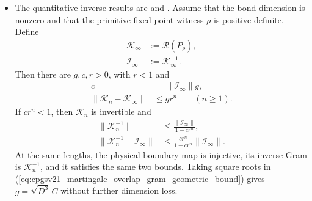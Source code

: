 \documentclass{article}
\begin{document}
\begin{itemize}
    \item The quantitative inverse results are
          and
          .
          Assume that the bond dimension is nonzero and that the primitive
          fixed-point witness $\rho$ is positive definite. Define
          \begin{align}
              \mathcal K_\infty
               & :=\mathscr R(P_\rho),
              \label{eq:cpgsv21_martingale_overlap_limiting_gram} \\
              \mathcal I_\infty
               & :=\mathcal K_\infty^{-1}.
              \label{eq:cpgsv21_martingale_overlap_limiting_inverse_gram}
          \end{align}
          Then there are $g,c,r>0$, with $r<1$ and
          \begin{align}
              c
               & =\lVert\mathcal I_\infty\rVert g,
              \label{eq:cpgsv21_martingale_overlap_inverse_perturbation_constant} \\
              \lVert\mathcal K_n-\mathcal K_\infty\rVert
               & \leq gr^n
              \qquad(n\geq1).
              \label{eq:cpgsv21_martingale_overlap_gram_norm_geometric_bound}
          \end{align}
          If $cr^n<1$, then $\mathcal K_n$ is invertible and
          \begin{align}
              \lVert\mathcal K_n^{-1}\rVert
               & \leq
              \frac{\lVert\mathcal I_\infty\rVert}{1-cr^n},
              \label{eq:cpgsv21_martingale_overlap_inverse_gram_bound} \\
              \lVert\mathcal K_n^{-1}-\mathcal I_\infty\rVert
               & \leq
              \frac{cr^n}{1-cr^n}\lVert\mathcal I_\infty\rVert.
              \label{eq:cpgsv21_martingale_overlap_inverse_gram_difference}
          \end{align}
          At the same lengths, the physical boundary map is injective, its inverse
          Gram is $\mathcal K_n^{-1}$, and it satisfies the same two bounds. Taking
          square roots in
          (\ref{eq:cpgsv21_martingale_overlap_gram_geometric_bound}) gives
          $g=\sqrt{D^3}\,C$ without further dimension loss.


\end{itemize}
\end{document}
